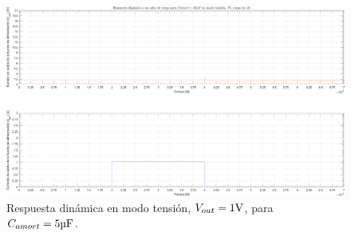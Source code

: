\clearpage

\begin{figure}[H] %
\begin{center}
\includegraphics[width=1.1 \textwidth, angle=90]{./img/plots/dynamic/power_supply_CAMORT_22u_STEP_Modo2.png}
\caption{\label{fig:fig_power_supply_CAMORT_STEP_22u_Modo2}\footnotesize{Respuesta dinámica en modo tensión, $V_{out} = 1 \si[per-mode=symbol]{\volt}$, para $C_{amort} = 5 \si[per-mode=symbol]{\micro\farad} $.}}
\end{center}
\end{figure}

\clearpage

